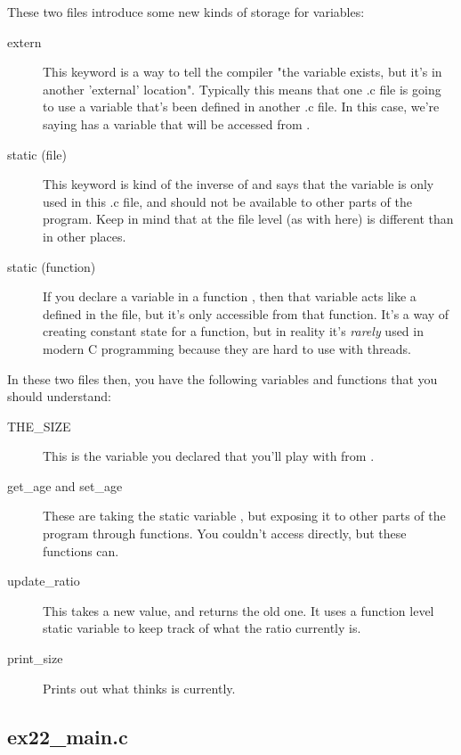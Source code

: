 These two files introduce some new kinds of storage for variables:

\begin{description}
\item[extern] This keyword is a way to tell the compiler "the variable exists,
    but it's in another 'external' location".  Typically this means that one
    .c file is going to use a variable that's been defined in another .c file.
    In this case, we're saying  has a variable 
    that will be accessed from .
\item[static (file)] This keyword is kind of the inverse of  and says
    that the variable is only used in this .c file, and should not be available
    to other parts of the program.  Keep in mind that  at the
    file level (as with  here) is different than in other places.
\item[static (function)] If you declare a variable in a function , then
    that variable acts like a  defined in the file, but it's only
    accessible from that function. It's a way of creating constant state for a
    function, but in reality it's \emph{rarely} used in modern C programming
    because they are hard to use with threads.
\end{description}

In these two files then, you have the following variables and functions
that you should understand:

\begin{description}
\item[THE\_SIZE] This is the variable you declared  that you'll
    play with from .
\item[get\_age and set\_age] These are taking the static variable ,
    but exposing it to other parts of the program through functions.  You couldn't
    access  directly, but these functions can.
\item[update\_ratio] This takes a new  value, and returns the old
    one.  It uses a function level static variable  to keep track
    of what the ratio currently is.
\item[print\_size] Prints out what  thinks  is
    currently.
\end{description}

\subsection{ex22\_main.c}


